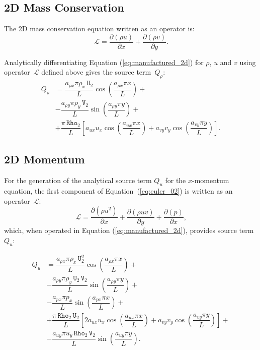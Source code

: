 \documentclass[10pt]{article}
\newcommand{\Diff}[2] {\dfrac{\partial( #1)}{\partial #2}}
\newcommand{\Rho}{\,\mathtt{Rho}}
\newcommand{\U}{\,\mathtt{U}}
\newcommand{\V}{\,\mathtt{V}}
\newcommand{\Lo}{\,\mathcal{L}}
\begin{document}
\subsection{2D Mass Conservation}

The 2D mass conservation equation written as an operator is:
\begin{equation*}
 \Lo=  \Diff{\rho u}{x}+\Diff{\rho v}{y}.
\end{equation*}

Analytically differentiating Equation (\ref{eq:manufactured_2d}) for $\rho$, $u$ and $v$ using operator $\Lo$ defined above gives  the source term~$Q_{\rho}$:
\begin{equation}
 \begin{split}
Q_\rho &= \dfrac{a_{\rho x} \pi \rho_x \U_2 }{L}\cos\left(\dfrac{a_{\rho x} \pi x}{L}\right)+\\
&-\dfrac{a_{\rho y} \pi \rho_y \V_2 }{L}\sin\left(\dfrac{a_{\rho y} \pi y}{L}\right)+\\
&+\dfrac{\pi \Rho_2}{L}\left[a_{ux} u_x \cos\left(\dfrac{a_{ux} \pi x}{L}\right)+a_{vy} v_y \cos\left(\dfrac{a_{vy} \pi y}{L}\right)\right].
 \end{split}
\end{equation}

\subsection{2D Momentum}

For the generation of the analytical source term $Q_u$ for the $x$-momentum equation, the first component of Equation~(\ref{eq:euler_02}) is written as an  operator $\Lo$:
\begin{equation*}
 \Lo= \Diff{\rho u^2}{x}+\Diff{\rho uv}{y} + \Diff{p}{x},
\end{equation*}
which, when operated in Equation (\ref{eq:manufactured_2d}), provides source term $Q_{u}$:

\begin{equation}
 \begin{split}
Q_u &=  \dfrac{a_{\rho x} \pi \rho_x \U_2^2}{L}\cos\left(\dfrac{a_{\rho x} \pi x}{L}\right)+\\
&- \dfrac{a_{\rho y} \pi \rho_y \U_2 \V_2}{L}\sin\left(\dfrac{a_{\rho y} \pi y}{L}\right)+\\
&-\dfrac{a_{px} \pi p_x }{L}\sin\left(\dfrac{a_{px} \pi x}{L}\right)+\\
&+\dfrac{\pi \Rho_2 \U_2}{L}\left[2 a_{ux} u_x \cos\left(\dfrac{a_{ux} \pi x}{L}\right)+a_{vy} v_y \cos\left(\dfrac{a_{vy} \pi y}{L}\right)\right]+\\
&-\dfrac{a_{uy} \pi u_y \Rho_2 \V_2 }{L}\sin\left(\dfrac{a_{uy} \pi y}{L}\right).
 \end{split}
\end{equation}
\end{document}
